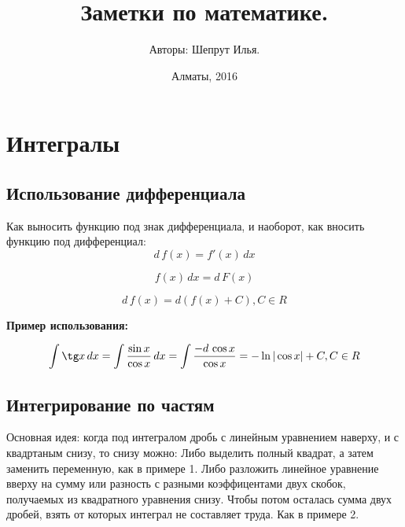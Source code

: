 \documentclass[12pt,a4paper]{article}
\title{Заметки по математике.}
\author{Авторы: Шепрут Илья.}
\date{Алматы, 2016}
\begin{document}
 \fontsize{12pt}{16pt}\selectfont

\maketitle

\tableofcontents

\thispagestyle{empty}

\newpage

\setcounter{page}{1} %


\section{Интегралы}

\subsection{Использование дифференциала}

Как выносить функцию под знак дифференциала, и наоборот, как вносить функцию под дифференциал:
$$ d\, f(x) = f'(x)\, dx $$

$$ f(x)\, dx = d\, F(x) $$

$$ d\, f(x) = d(f(x) + C), C \in R $$

{\bfseries Пример использования: }

$$ \int \tg x\, dx = \int \frac{\sin x}{\cos x}\, dx = \int \frac{-d\, \cos x}{\cos x} = -\ln |\cos x| + C, C \in R $$

\subsection{Интегрирование по частям}

Основная идея: когда под интегралом дробь с линейным уравнением наверху, и с квадртаным снизу, то снизу можно: Либо выделить полный квадрат, а затем заменить переменную, как в примере 1.   Либо разложить линейное уравнение вверху на сумму или разность с разными коэффицентами двух скобок, получаемых из квадратного уравнения снизу. Чтобы потом осталась сумма двух дробей, взять от которых интеграл не составляет труда. Как в примере 2.
\end{document}
